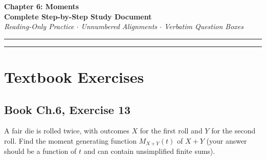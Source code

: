 \documentclass[11pt,a4paper]{article}
\begin{document}
\begin{center}
    {\LARGE \textbf{Chapter 6: Moments}}\\[8pt]
    {\Large \textbf{Complete Step-by-Step Study Document}}\\[6pt]
    {\small \textit{Reading-Only Practice $\cdot$ Unnumbered Alignments $\cdot$ Verbatim Question Boxes}}
\end{center}

\vspace{5pt}
\hrule
\vspace{10pt}

\tableofcontents

\vspace{15pt}
\hrule
\vspace{15pt}

\section{Textbook Exercises}

\subsection{Book Ch.6, Exercise 13}
\begin{tcolorbox}[title={Book Ch.6, Exercise 13}]
A fair die is rolled twice, with outcomes $X$ for the first roll and $Y$ for the second roll. Find the moment generating function $M_{X+Y}(t)$ of $X+Y$ (your answer should be a function of $t$ and can contain unsimplified finite sums).
\end{tcolorbox}
\end{document}
